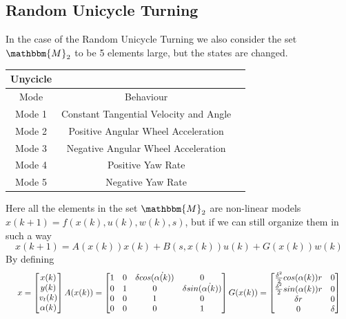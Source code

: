 \documentclass[twocolumn]{article}
\begin{document}
\subsection*{Random Unicycle Turning}
In the case of the Random Unicycle Turning we also consider the set $\mathbbm{M}_{2}$ to be 5 elements large, but the states are changed.
    \begin{center}
        \begin{tabular}{||c||c |c |}%
            \hline
             Unycicle  \\
            \hline\hline
            Mode & Behaviour  \\ [0.5ex]
            \hline\hline
            Mode 1 & Constant Tangential Velocity and Angle \\
            \hline
            Mode 2  & Positive Angular Wheel Acceleration  \\
            \hline
            Mode 3  & Negative Angular Wheel Acceleration \\
            \hline
            Mode 4  & Positive Yaw Rate  \\
            \hline
            Mode 5  & Negative Yaw Rate   \\ [1ex]
            \hline
        \end{tabular}
    \end{center}
Here all the elements in the set $\mathbbm{M}_{2}$ are non-linear models $x(k+1)=f(x(k),u(k),w(k),s)$, but if we can still organize them in such a way
    \begin{equation}
        x(k+1)= A(x(k))x(k) + B(s,x(k))u(k) + G(x(k))w(k)
    \end{equation}
By defining
    \begin{equation*}      
     \resizebox{.99\columnwidth}{!}{ $ x=\begin{bmatrix} x(k) \\ y(k) \\ v_{t}(k) \\ \alpha(k) \\ \end{bmatrix}  
        A(x(k))=\begin{bmatrix}
            1 & 0 & \delta cos(\dot{\alpha (k)}) & 0      \\
            0 & 1 & 0      & \delta sin(\dot{\alpha (k)}) \\
            0 & 0 & 1      & 0      \\
            0 & 0 & 0      & 1      \\
        \end{bmatrix}
         G(x(k))=\begin{bmatrix}
            \frac{\delta^{2}}{2} cos(\alpha (k))r & 0  \\
            \frac{\delta^{2}}{2} sin(\alpha (k))r & 0 \\
            \delta r    & 0          \\
            0 & \delta     \\
        \end{bmatrix}
    $ } \end{equation*}
\end{document}
